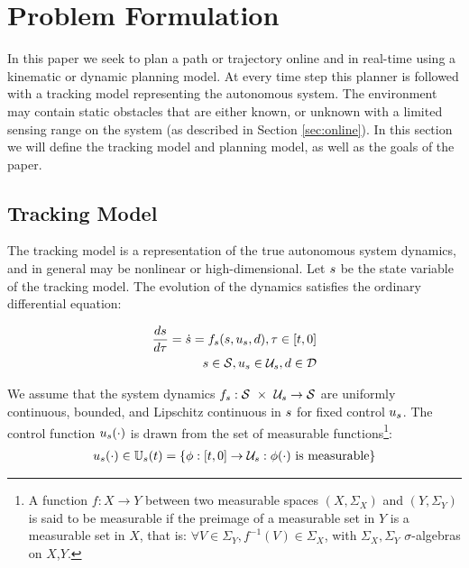 \section{Problem Formulation \label{sec:formulation}}
In this paper we seek to plan a path or trajectory online and in real-time using a kinematic or dynamic planning model. At every time step this planner is followed with a tracking model representing the autonomous system. The environment may contain static obstacles that are either known, or unknown with a limited sensing range on the system (as described in Section \ref{sec:online}). In this section we will define the tracking model and planning model, as well as the goals of the paper.

\subsection{Tracking Model}
The tracking model is a representation of the true autonomous system dynamics, and in general may be nonlinear or high-dimensional. Let $s$ be the state variable of the tracking model. The evolution of the dynamics satisfies the ordinary differential equation:

\begin{equation}
\begin{aligned}
\label{eq:tdyn}
\frac{ds}{d\tau} = \dot{s} = f_s(s, u_s, d), \tau \in [t, 0] \\
s \in \mathcal{S}, u_s \in \mathcal{U}_s, d \in \mathcal{D}
\end{aligned}
\end{equation}

We assume that the system dynamics $f_s : \mathcal{S}\ \times\ \mathcal{U}_s \rightarrow \mathcal{S}$ are uniformly continuous, bounded, and Lipschitz continuous in $s$ for fixed control $u_s$. The control function $u_s(\cdot)$ is drawn from the set of measurable functions\footnote{A function $f:X\to Y$ between two measurable spaces $(X,\Sigma_X)$ and $(Y,\Sigma_Y)$ is said to be measurable if the preimage of a measurable set in $Y$ is a measurable set in $X$, that is: $\forall V\in\Sigma_Y, f^{-1}(V)\in\Sigma_X$, with $\Sigma_X,\Sigma_Y$ $\sigma$-algebras on $X$,$Y$.}:
\begin{equation}
\begin{aligned}
u_s(\cdot) \in \mathbb{U}_s(t) = \{\phi: [t, 0] \rightarrow \mathcal{U}_s: \phi(\cdot) \text{ is measurable}\}
\end{aligned}
\end{equation}

